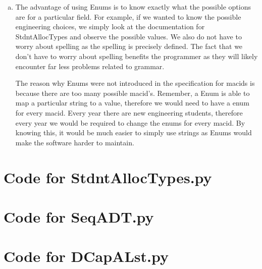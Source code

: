 \documentclass[12pt]{article}
\begin{document}
\begin{enumerate}[a)]
  \item The advantage of using Enums is to know exactly what the possible options are for a particular field.
  For example, if we wanted to know the possible engineering choices, we simply look at the documentation for
  StdntAllocTypes and observe the possible values.
  We also do not have to worry about spelling as the spelling is precisely defined.
  The fact that we don't have to worry about spelling benefits the programmer as they will likely encounter far less
  problems related to grammar.

  The reason why Enums were not introduced in the specification for macids is because there are too many
  possible macid's.
  Remember, a Enum is able to map a particular string to a value, therefore we would need to have a enum for every
  macid.
  Every year there are new engineering students, therefore every year we would be required to change the enums for
  every macid.
  By knowing this, it would be much easier to simply use strings as Enums would make the software harder to maintain.

\end{enumerate}

\newpage

\lstset{language=Python, basicstyle=\tiny, breaklines=true, showspaces=false,
  showstringspaces=false, breakatwhitespace=true}

\def\thesection{\Alph{section}}

\section{Code for StdntAllocTypes.py}

\noindent 

\newpage

\section{Code for SeqADT.py}

\noindent 

\newpage

\section{Code for DCapALst.py}

\noindent 
\end{document}
